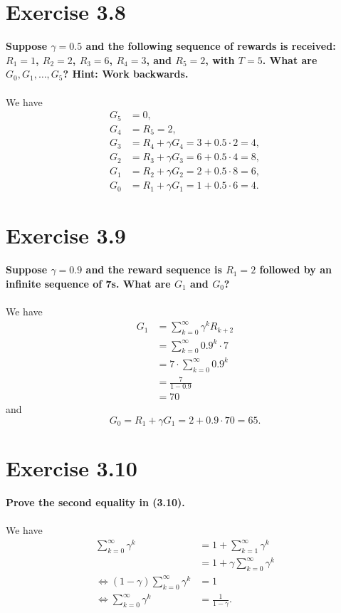 \documentclass[a4paper,11pt]{article}
\numberwithin{equation}{section}
\theoremstyle{remark}
\begin{document}
\section{Exercise 3.8}

\textbf{Suppose $\gamma = 0.5$ and the following sequence of rewards is received: $R_1 = 1$, $R_2 = 2$, $R_3 = 6$, $R_4 = 3$, and $R_5 = 2$, with $T = 5$. What are $G_0, G_1, \dots, G_5$? Hint: Work backwards.}
\\ \\
We have
\begin{align*}
	G_5 & = 0, \\
	G_4 & = R_5 = 2, \\
	G_3 & = R_4 + \gamma G_4 = 3 + 0.5 \cdot 2 = 4, \\
	G_2 & = R_3 + \gamma G_3 = 6 + 0.5 \cdot 4 = 8, \\
	G_1 & = R_2 + \gamma G_2 = 2 + 0.5 \cdot 8 = 6, \\
	G_0 & = R_1 + \gamma G_1 = 1 + 0.5 \cdot 6 = 4. 
\end{align*}
	
\section{Exercise 3.9}

\textbf{Suppose $\gamma = 0.9$ and the reward sequence is $R_1 = 2$ followed by an infinite sequence of 7s. What are $G_1$ and $G_0$?}
\\ \\
We have 
\begin{align*}
	G_1 & = \sum_{k=0}^{\infty} \gamma^{k} R_{k+2} \\
		& = \sum_{k=0}^{\infty} 0.9^k \cdot 7 \\
		& = 7 \cdot \sum_{k=0}^{\infty} 0.9^k \\
		& = \frac{7}{1 - 0.9} \\
		& = 70
\end{align*}
and 
\[
	G_0 = R_1 + \gamma G_1 = 2 + 0.9 \cdot 70 = 65.
\]

\section{Exercise 3.10}

\textbf{Prove the second equality in (3.10).}
\\ \\
We have 
\begin{align*}
	\sum_{k=0}^{\infty} \gamma^k & = 1 + \sum_{k=1}^{\infty} \gamma^k \\
	& = 1 + \gamma \sum_{k=0}^{\infty} \gamma^k \\
	\iff (1 - \gamma) \sum_{k=0}^{\infty} \gamma^k & = 1 \\	
	\iff \sum_{k=0}^{\infty} \gamma^k & = \frac{1}{1 - \gamma}.	
\end{align*}
\end{document}
